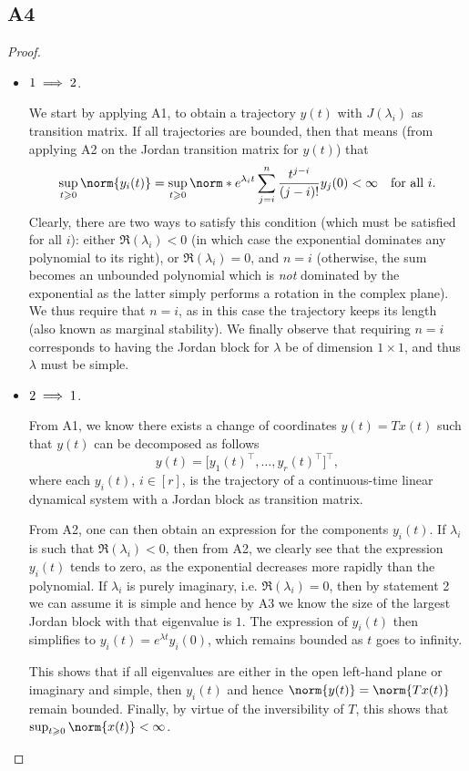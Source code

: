 \documentclass[11pt]{article}
\begin{document}
\subsection*{A4}
\begin{proof}\leavevmode
\begin{itemize}
	\item \(\textnormal{1} \implies \textnormal{2}\).
	
	We start by applying A1, to obtain a trajectory \(y(t)\) with \(J(\lambda_i)\) as transition matrix.
	If all trajectories are bounded, then that means (from applying A2 on the Jordan transition matrix for \(y(t)\)) that
	\[
	\sup_{t \geqslant 0} \norm{y_i(t)} = \sup_{t \geqslant 0} \norm*{e^{\lambda_i t} \sum_{j = i}^n \frac{t^{j - i}}{(j - i)!} y_j(0)} < \infty \quad \textnormal{for all } i.
	\]
	Clearly, there are two ways to satisfy this condition (which must be satisfied for all \(i\)): either \(\Re(\lambda_i) < 0\) (in which case the exponential dominates any polynomial to its right), or \(\Re(\lambda_i) = 0\), and \(n = i\) (otherwise, the sum becomes an unbounded polynomial which is \textit{not} dominated by the exponential as the latter simply performs a rotation in the complex plane).
	We thus require that \(n = i\), as in this case the trajectory keeps its length (also known as marginal stability).
	We finally observe that requiring \(n = i\) corresponds to having the Jordan block for \(\lambda\) be of dimension \(1 \times 1\), and thus \(\lambda\) must be simple.
	\item \(\textnormal{2} \implies \textnormal{1}\).

	From A1, we know there exists a change of coordinates $y(t)=Tx(t)$ such that $y(t)$ can be decomposed as follows
	\[
	y(t) = \big[y_1(t)^\top, \dots, y_r(t)^\top\big]^\top,
	\]
	where each $y_i(t)$, $i \in [r]$, is the trajectory of a continuous-time linear dynamical system with a Jordan block as transition matrix.
	
	From A2, one can then obtain an expression for the components $y_i(t)$.
	If $\lambda_i$ is such that $\Re(\lambda_i)<0$, then from A2, we clearly see that the expression $y_i(t)$ tends to zero, as the exponential decreases more rapidly than the polynomial.
	If $\lambda_i$ is purely imaginary, i.e. $\Re(\lambda_i) = 0$, then by statement 2 we can assume it is simple and hence by A3 we know the size of the largest Jordan block with that eigenvalue is \(1\).
	The expression of $y_i(t)$ then simplifies to $y_i(t)=e^{\lambda t} y_i(0)$, which remains bounded as \(t\) goes to infinity. %
	
	This shows that if all eigenvalues are either in the open left-hand plane or imaginary and simple, then $y_i(t)$ and hence $\norm{y(t)}=\norm{Tx(t)}$ remain bounded.
	Finally, by virtue of the inversibility of \(T\), this shows that \(\sup_{t \geqslant 0} \norm{x(t)} < \infty\).\qedhere
\end{itemize}
\end{proof}
\end{document}
